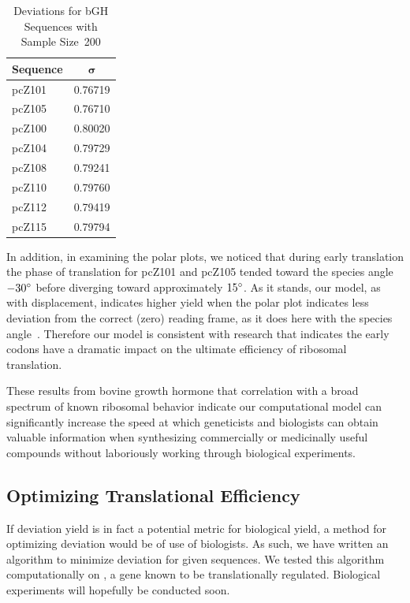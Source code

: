 \documentclass[12pt, draft]{article}
\numberwithin{equation}{section}
\begin{document}
\begin{table}[tbp]
\begin{center}
    \begin{tabular}{lc}
        \toprule
        \textbf{Sequence} & $\mathbf{\sigma}$\\
        \midrule
        pcZ101 & 0.76719\\
        pcZ105 & 0.76710\\
        \midrule
        pcZ100 & 0.80020\\
        pcZ104 & 0.79729\\
        pcZ108 & 0.79241\\
        pcZ110 & 0.79760\\
        pcZ112 & 0.79419\\
        pcZ115 & 0.79794\\
        \bottomrule
    \end{tabular}
    \caption{Deviations for bGH Sequences with Sample Size~200}
    \label{bgh:deviation}
\end{center}
\end{table}

In addition, in examining the polar plots, we noticed that during
early translation the phase of translation for pcZ101 and pcZ105 tended toward the species
angle $-30^\circ$ before diverging toward approximately $15^\circ$. As
it stands, our model, as with displacement, indicates higher yield when the polar plot
indicates less deviation from the correct (zero) reading frame, as it
does here with the species angle~\cite{lalit:mechanics}. Therefore our
model is consistent with research that indicates
the early codons have a dramatic impact on the ultimate efficiency of
ribosomal translation.

These results from bovine growth hormone that correlation with a broad
spectrum of known ribosomal behavior indicate our computational model
can significantly increase the speed at which geneticists and
biologists can obtain valuable information when synthesizing
commercially or medicinally useful compounds without laboriously
working through biological experiments.

\subsection{Optimizing Translational Efficiency}

If deviation yield is in fact a potential metric for biological yield,
a method for optimizing deviation would be of use of biologists.  As such,
we have written an algorithm to minimize deviation for given sequences.
We tested this algorithm computationally on \rpoS, a gene known to
be translationally regulated.  Biological experiments will hopefully be
conducted soon.
\end{document}
